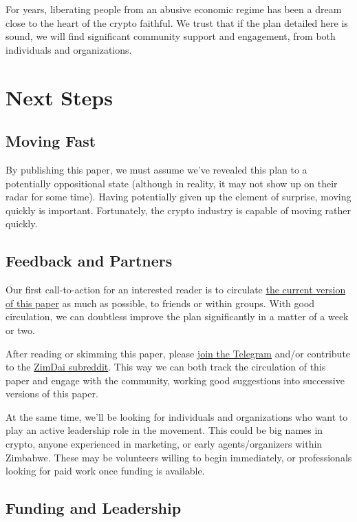 \documentclass{article}
\begin{document}
For years, liberating people from an abusive economic regime has been a dream close to the heart of the crypto faithful. We trust that if the plan detailed here is sound, we will find significant community support and engagement, from both individuals and organizations.

\section{Next Steps} \label{next steps}

\subsection{Moving Fast} \label{moving fast}

By publishing this paper, we must assume we've revealed this plan to a potentially oppositional state (although in reality, it may not show up on their radar for some time). Having potentially given up the element of surprise, moving quickly is important. Fortunately, the crypto industry is capable of moving rather quickly.

\subsection{Feedback and Partners} \label{feedback and partners}

Our first call-to-action for an interested reader is to circulate \href{https://github.com/coinop-logan/ZimDai/blob/master/whitepaper.pdf}{the current version of this paper} as much as possible, to friends or within groups. With good circulation, we can doubtless improve the plan significantly in a matter of a week or two.

After reading or skimming this paper, please \href{https://t.me/joinchat/EGlTfRYexSWmSy-C75Q2Xw}{join the Telegram} and/or contribute to the \href{https://www.reddit.com/r/ZimDai}{ZimDai subreddit}. This way we can both track the circulation of this paper and engage with the community, working good suggestions into successive versions of this paper.

At the same time, we'll be looking for individuals and organizations who want to play an active leadership role in the movement. This could be big names in crypto, anyone experienced in marketing, or early agents/organizers within Zimbabwe. These may be volunteers willing to begin immediately, or professionals looking for paid work once funding is available.

\subsection{Funding and Leadership} \label{funding and organization}
\end{document}
